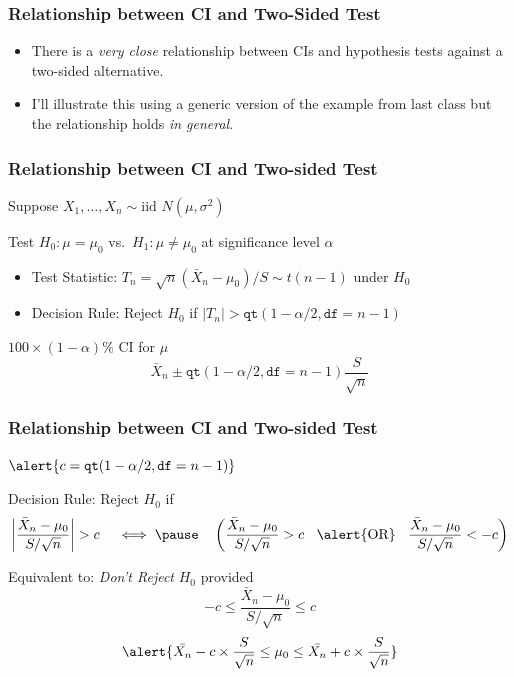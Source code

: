 \documentclass[handout]{beamer}
\begin{document}
\begin{frame}
	\frametitle{Relationship between CI and Two-Sided Test}

	\begin{itemize}
		\item There is a \emph{very close} relationship between CIs and hypothesis tests against a two-sided alternative.
		\item I'll illustrate this using a generic version of the example from last class but the relationship holds \emph{in general}.
	\end{itemize}
\end{frame}
\begin{frame}
\frametitle{Relationship between CI and Two-sided Test}
Suppose $X_1, \hdots, X_n \sim \mbox{iid } N(\mu,\sigma^2)$

\vspace{1em}
	\begin{block}{Test $H_0\colon \mu = \mu_0$ vs.\ $H_1\colon \mu \neq \mu_0$ at significance level $\alpha$} 
		\begin{itemize}
			\item Test Statistic:  $T_n = \sqrt{n}(\bar{X}_n - \mu_0)/S \sim t(n-1)$ under $H_0$ 
			\item Decision Rule: Reject $H_0$ if $|T_n| > \texttt{qt}(1-\alpha/2, \texttt{df}=n-1)$ 
			\end{itemize}

			\pause
\end{block}
	\begin{block}{$100\times (1-\alpha)\%$ CI for $\mu$} 
		$$\bar{X}_n \pm \texttt{qt}(1-\alpha/2, \texttt{df}=n-1) \frac{S}{\sqrt{n}}$$
\end{block}
\end{frame}
\begin{frame}
\frametitle{Relationship between CI and Two-sided Test}
$\alert{c =  \texttt{qt}(1-\alpha/2, \texttt{df}=n-1)}$
\begin{block}{Decision Rule: Reject $H_0$ if}
		$$\left|\frac{\bar{X}_n - \mu_0}{S/\sqrt{n}} \right|> c \quad \iff \pause  \quad \left(\frac{\bar{X}_n - \mu_0}{S/\sqrt{n}}> c \;\;\mbox{  \alert{OR}  }\;\;\frac{\bar{X}_n - \mu_0}{S/\sqrt{n}}< - c\right)$$
\end{block}

\pause
\begin{block}{Equivalent to: \emph{Don't Reject} $H_0$ provided}
	$$-c \leq \frac{\bar{X}_n - \mu_0}{S/\sqrt{n}}\leq c $$ \pause
	$$\alert{\bar{X_n} - c\times \frac{S}{\sqrt{n}} \leq \mu_0 \leq \bar{X_n} + c\times \frac{S}{\sqrt{n}}}$$
\end{block}
\end{frame}
\end{document}
